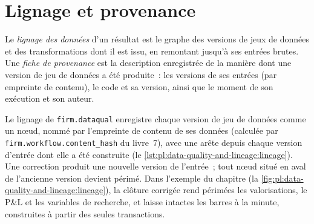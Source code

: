 \section{Lignage et provenance}

\begin{definition}\label{def:pl:data-quality-and-lineage:lineage}
Le \emph{lignage des données} d'un résultat est le graphe des versions de jeux de données et des transformations dont il est issu, en remontant
jusqu'à ses entrées brutes. Une \emph{fiche de provenance} est la description enregistrée de la manière dont une version de jeu de données a été
produite~: les versions de ses entrées (par empreinte de contenu), le code et sa version, ainsi que le moment de son exécution et son auteur.
\end{definition}

Le lignage de \texttt{firm.dataqual} enregistre chaque version de jeu de données comme un nœud, nommé par l'empreinte de contenu de ses données
(calculée par \texttt{firm.workflow.content\_hash} du livre~7), avec une arête depuis chaque version d'entrée dont
elle a été construite (le \cref{lst:pl:data-quality-and-lineage:lineage}). Une correction produit une nouvelle version de l'entrée~; tout nœud situé en aval de
l'ancienne version devient périmé. Dans l'exemple du chapitre (la \cref{fig:pl:data-quality-and-lineage:lineage}), la clôture corrigée rend
périmées les valorisations, le P\&L et les variables de recherche, et laisse intactes les barres à la minute, construites à partir des seules transactions.

\label{lst:pl:data-quality-and-lineage:lineage}


